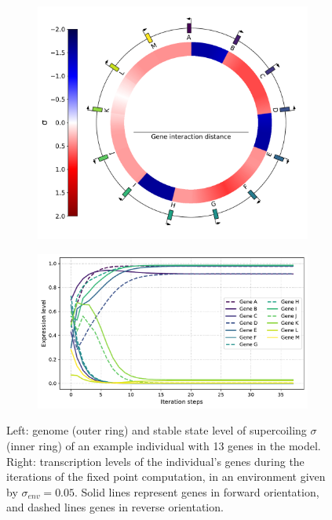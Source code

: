 \begin{figure}[H]
  \centering
  \begin{subfigure}[t]{0.42\textwidth}
    \includegraphics[width=\textwidth]{alife/img/13genes_genome.pdf}
    \label{subfig:alife:13genes_genome}
  \end{subfigure}
  \begin{subfigure}[t]{0.56\textwidth}
    \includegraphics[width=\textwidth]{alife/img/13genes_expr_level.pdf}
    \label{subfig:alife:13genes_expr}
  \end{subfigure}
  \caption[Example individual in the proof-of-concept model]{Left: genome (outer ring) and stable state level of supercoiling $\sigma$ (inner ring) of an example individual with 13 genes in the model.
  Right: transcription levels of the individual's genes during the iterations of the fixed point computation, in an environment given by $\sigma_{env} = 0.05$.
  Solid lines represent genes in forward orientation, and dashed lines genes in reverse orientation.}
  \label{fig:alife:13genes}
\end{figure}

